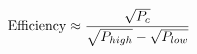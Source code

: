 \documentclass[preview]{standalone}
\begin{document}
\begin{align*}
\special{dvisvgm:raw <g id='unique000'>}\text{Efficiency} \approx \frac{\sqrt{P_c}}{\sqrt{P_{high}} - \sqrt{P_{low}}}\special{dvisvgm:raw </g>}
\end{align*}
\end{document}
